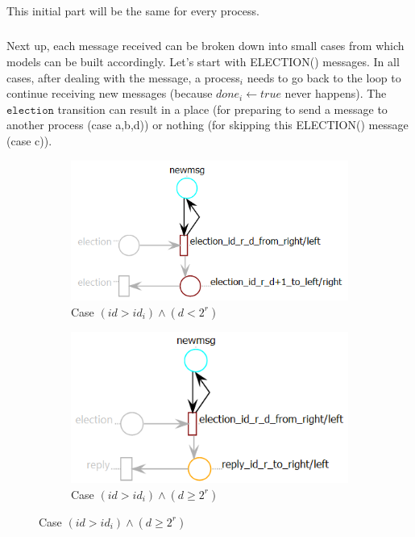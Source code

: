 \documentclass{article}
\begin{document}
	\subparagraph{}This initial part will be the same for every process.
	\newpage
	\subparagraph{}Next up, each message received can be broken down into small cases from which models can be built accordingly. Let's start with ELECTION() messages. In all cases, after dealing with the message, a process$_i$ needs to go back to the loop to continue receiving new messages (because $done_i \leftarrow true$ never happens). The $\mathtt{election}$ transition can result in a place (for preparing to send a message to another process (case a,b,d)) or nothing (for skipping this ELECTION() message (case c)).
	\begin{figure}[ht] 
		\begin{subfigure}[b]{0.5\linewidth}
			\centering
			\hspace*{-40pt}
			\includegraphics[scale=0.6]{election_cas1} 
			\caption{Case $(id>id_i) \wedge (d<2^r)$} 
			\label{fig13:a} 
			\vspace{4ex}
		\end{subfigure}%
		\begin{subfigure}[b]{0.5\linewidth}
			\centering
			\hspace*{20pt}
			\includegraphics[scale=0.6]{election_cas2} 
			\caption{Case $(id>id_i) \wedge (d\geq2^r)$} 
			\label{fig13:b} 
			\vspace{4ex}

\end{subfigure}
\end{figure}
\end{document}
